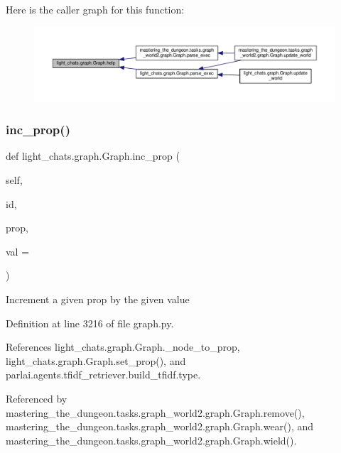 Here is the caller graph for this function\+:
\nopagebreak
\begin{figure}[H]
\begin{center}
\leavevmode
\includegraphics[width=350pt]{classlight__chats_1_1graph_1_1Graph_a6a6d39a24244430a899bbc0b752baf25_icgraph}
\end{center}
\end{figure}
\mbox{\label{classlight__chats_1_1graph_1_1Graph_a871d833484089923fa5d1d4bb357ec7a}} 
\subsubsection{\texorpdfstring{inc\+\_\+prop()}{inc\_prop()}}
{\footnotesize\ttfamily def light\+\_\+chats.\+graph.\+Graph.\+inc\+\_\+prop (\begin{DoxyParamCaption}\item[{}]{self,  }\item[{}]{id,  }\item[{}]{prop,  }\item[{}]{val = {} }\end{DoxyParamCaption})}

\begin{DoxyVerb}Increment a given prop by the given value\end{DoxyVerb}
 

Definition at line 3216 of file graph.\+py.



References light\+\_\+chats.\+graph.\+Graph.\+\_\+node\+\_\+to\+\_\+prop, light\+\_\+chats.\+graph.\+Graph.\+set\+\_\+prop(), and parlai.\+agents.\+tfidf\+\_\+retriever.\+build\+\_\+tfidf.\+type.



Referenced by mastering\+\_\+the\+\_\+dungeon.\+tasks.\+graph\+\_\+world2.\+graph.\+Graph.\+remove(), mastering\+\_\+the\+\_\+dungeon.\+tasks.\+graph\+\_\+world2.\+graph.\+Graph.\+wear(), and mastering\+\_\+the\+\_\+dungeon.\+tasks.\+graph\+\_\+world2.\+graph.\+Graph.\+wield().

